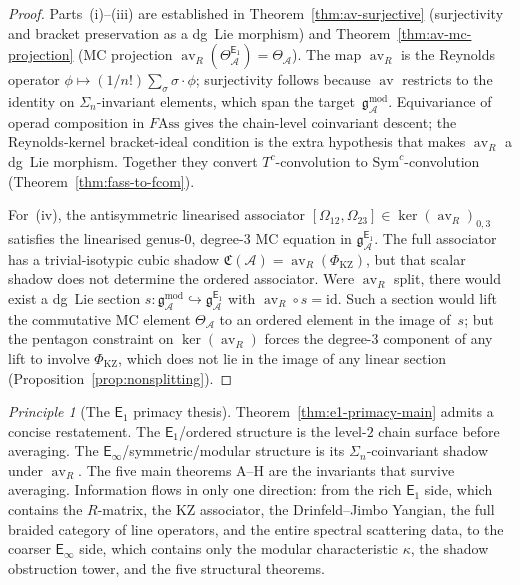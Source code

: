 \documentclass[11pt,reqno]{amsart}
\theoremstyle{definition}
\theoremstyle{remark}
\newtheorem{principle}[theorem]{Principle}
\newcommand{\cA}{\mathcal{A}}
\newcommand{\Eone}{\mathsf{E}_{1}}
\newcommand{\Einf}{\mathsf{E}_{\infty}}
\newcommand{\Sym}{\mathrm{Sym}}
\newcommand{\Ass}{\mathrm{Ass}}
\DeclareMathOperator{\av}{av}
\newcommand{\gmod}{\mathfrak{g}^{\mathrm{mod}}_{\cA}}
\newcommand{\gEone}{\mathfrak{g}^{\Eone}_{\cA}}
\newcommand{\id}{\mathrm{id}}
\newcommand{\FMAss}{F\!\Ass}
\numberwithin{equation}{section}
\begin{document}
\begin{proof}
Parts~(i)--(iii) are established in
Theorem~\ref{thm:av-surjective} (surjectivity and bracket
preservation as a dg~Lie morphism) and
Theorem~\ref{thm:av-mc-projection} (MC projection
$\av_R(\Theta^{\Eone}_\cA) = \Theta_\cA$). The map $\av_R$ is the
Reynolds operator
$\phi \mapsto (1/n!)\sum_\sigma \sigma \cdot \phi$; surjectivity
follows because $\av$ restricts to the identity on
$\Sigma_n$-invariant elements, which span the target~$\gmod$.
Equivariance of operad composition in $\FMAss$ gives the chain-level
coinvariant descent; the Reynolds-kernel bracket-ideal condition is the
extra hypothesis that makes $\av_R$ a dg~Lie morphism. Together they
convert $T^c$-convolution to $\Sym^c$-convolution
(Theorem~\ref{thm:fass-to-fcom}).

For~(iv), the antisymmetric linearised associator
$[\Omega_{12},\Omega_{23}] \in \ker(\av_R)_{0,3}$ satisfies the
linearised genus-$0$, degree-$3$ MC equation in $\gEone$. The full
associator has a trivial-isotypic cubic shadow
$\mathfrak C(\cA)=\av_R(\Phi_{\mathrm{KZ}})$, but that scalar shadow
does not determine the ordered associator. Were $\av_R$ split, there
would exist a dg~Lie section
$s\colon \gmod \hookrightarrow \gEone$ with $\av_R \circ s = \id$.
Such a section would lift the commutative MC element $\Theta_\cA$
to an ordered element in the image of~$s$; but the pentagon
constraint on $\ker(\av_R)$ forces the degree-$3$ component of any
lift to involve $\Phi_{\mathrm{KZ}}$, which does not lie in the
image of any linear section
(Proposition~\ref{prop:nonsplitting}).
\end{proof}

\begin{principle}[The $\Eone$ primacy thesis]
\label{princ:e1-primacy}
Theorem~\textup{\ref{thm:e1-primacy-main}} admits a concise
restatement. The $\Eone$/ordered structure is the level-$2$ chain
surface before averaging. The $\Einf$/symmetric/modular structure is its
$\Sigma_n$-coinvariant shadow under $\av_R$. The five main theorems
A--H are the invariants that survive averaging. Information flows
in only one direction: from the rich $\Eone$ side, which contains
the $R$-matrix, the KZ associator, the Drinfeld--Jimbo Yangian,
the full braided category of line operators, and the entire
spectral scattering data, to the coarser $\Einf$ side, which
contains only the modular characteristic $\kappa$, the shadow
obstruction tower, and the five structural theorems.
\end{principle}
\end{document}

